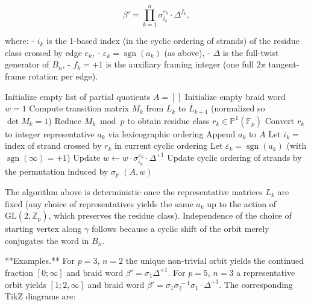 \[
\beta' = \prod_{k=1}^n \sigma_{i_k}^{\varepsilon_k} \cdot \Delta^{f_k},
\]

where:
- \(i_k\) is the 1-based index (in the cyclic ordering of strands) of the residue class crossed by edge \(e_k\),
- \(\varepsilon_k = \operatorname{sgn}(a_k)\) (as above),
- \(\Delta\) is the full-twist generator of \(B_n\),
- \(f_k = +1\) is the auxiliary framing integer (one full \(2\pi\) tangent-frame rotation per edge).

\begin{algorithmic}[1]
  \State Initialize empty list of partial quotients \(A = []\)
  \State Initialize empty braid word \(w = 1\)
    \State Compute transition matrix \(M_k\) from \(L_k\) to \(L_{k+1}\) (normalized so \(\det M_k = 1\))
    \State Reduce \(M_k \bmod p\) to obtain residue class \(r_k \in \mathbb{P}^1(\mathbb{F}_p)\)
    \State Convert \(r_k\) to integer representative \(a_k\) via lexicographic ordering
    \State Append \(a_k\) to \(A\)
    \State Let \(i_k =\) index of strand crossed by \(r_k\) in current cyclic ordering
    \State Let \(\varepsilon_k = \operatorname{sgn}(a_k)\) (with \(\operatorname{sgn}(\infty)=+1\))
    \State Update \(w \leftarrow w \cdot \sigma_{i_k}^{\varepsilon_k} \cdot \Delta^{+1}\)
    \State Update cyclic ordering of strands by the permutation induced by \(\sigma_p\)
  \EndFor
  \State \Return \((A, w)\)
\EndProcedure
\end{algorithmic}

The algorithm above is deterministic once the representative matrices \(L_k\) are fixed (any choice of representatives yields the same \(a_k\) up to the action of \(\mathrm{GL}(2,\mathbb{Z}_p)\), which preserves the residue class). Independence of the choice of starting vertex along \(\gamma\) follows because a cyclic shift of the orbit merely conjugates the word in \(B_n\).

**Examples.** For \(p=3\), \(n=2\) the unique non-trivial orbit yields the continued fraction \([0;\infty]\) and braid word \(\beta' = \sigma_1 \Delta^{+1}\). For \(p=5\), \(n=3\) a representative orbit yields \([1;2,\infty]\) and braid word \(\beta' = \sigma_1 \sigma_2^{\,-1} \sigma_1 \cdot \Delta^{+3}\). The corresponding TikZ diagrams are:

\begin{center}
\qquad
\begin{tikzpicture}[scale=0.8]
\end{tikzpicture}
\end{center}

